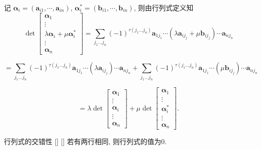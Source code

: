 \documentclass[UTF8]{ctexart}
\DeclareMathOperator{\0}{\mathbf{0}}
\DeclareMathOperator{\<}{\langle}
\renewcommand{\>}{\rangle}
\begin{document}
        \begin{prf}
        \begin{enumerate}
        记  \(\boldsymbol{\alpha}_i = (\boldsymbol{a}_{i1}, \cdots, \boldsymbol{a}_{in})\),  \(\boldsymbol{\alpha}_i^* = (\boldsymbol{b}_{i1}, \cdots, \boldsymbol{b}_{in})\), 则由行列式定义知
        \[
        \det \begin{bmatrix}
        \boldsymbol{\alpha}_1 \\
        \vdots \\
        \lambda \boldsymbol{\alpha}_i + \mu \boldsymbol{\alpha}_i^* \\
        \vdots \\
        \boldsymbol{\alpha}_n
        \end{bmatrix}
        =
        \sum_{j_1 \ldots j_n} (-1)^{\tau(j_1 \ldots j_n)} \boldsymbol{a}_{1j_1} \cdots (\lambda \boldsymbol{a}_{ij_j} + \mu \boldsymbol{b}_{ij_j}) \cdots \boldsymbol{a}_{nj_n}
        \]

        \[= \sum_{j_1 \ldots j_n} (-1)^{\tau(j_1 \ldots j_n)} \boldsymbol{a}_{1j_1} \cdots (\lambda \boldsymbol{a}_{ij_j}) \cdots \boldsymbol{a}_{nj_n} + \sum_{j_1 \ldots j_n} (-1)^{\tau(j_1 \ldots j_n)} \boldsymbol{a}_{1j_1} \cdots (\mu \boldsymbol{b}_{ij_j}) \cdots \boldsymbol{a}_{nj_n}\]

        \[= \lambda \det \begin{bmatrix}
        \boldsymbol{\alpha}_1 \\
        \vdots \\
        \boldsymbol{\alpha}_i \\
        \vdots \\
        \boldsymbol{\alpha}_n
        \end{bmatrix}
        +
        \mu \det \begin{bmatrix}
            \boldsymbol{\alpha}_1 \\
            \vdots \\
            \boldsymbol{\alpha}_i^* \\
            \vdots \\
            \boldsymbol{\alpha}_n
        \end{bmatrix}.
        \]
        \end{enumerate}
        \end{prf}

    \begin{thm}
			[]
			{行列式的交错性}
			[]
			[]
        若有两行相同, 则行列式的值为0.
    \end{thm}
\end{document}
